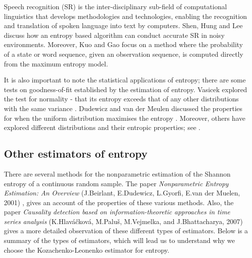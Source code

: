 \documentclass[12pt]{report}
\begin{document}
Speech recognition (SR) is the inter-disciplinary sub-field of computational linguistics that develops methodologies and technologies, enabling the recognition and translation of spoken language into text by computers. Shen, Hung and Lee \cite{speech1} discuss how an entropy based algorithm can conduct accurate SR in noisy environments. Moreover, Kuo and Gao \cite{speech2} focus on a method where the probability of a state or word sequence, given an observation sequence, is computed directly from the maximum entropy model.

It is also important to note the statistical applications of entropy; there are some tests on goodness-of-fit established by the estimation of entropy. Vasicek explored the test for normality - that its entropy exceeds that of any other distributions with the same variance \cite{stat1}. Dudewicz and van der Meulen discussed the properties for when the uniform distribution maximises the entropy \cite{stat2}. Moreover, others have explored different distributions and their entropic properties; see \cite{stat3, stat4}.
 



\subsection{Other estimators of entropy} \label{otherestimators}

There are several methods for the nonparametric estimation of the Shannon entropy of a continuous random sample. The paper \textit{Nonparametric Entropy Estimation: An Overview} (J.Beirlant, E.Dudewicz, L.Gyorfi, E.van der Muelen, 2001) \cite{paper10}, gives an account of the properties of these various methods. Also, the paper \textit{Causality detection based on information-theoretic approaches in time series analysis} (K.Hlav\'{a}\v{c}kov\'{a}, M.Palu\v{s}, M.Vejmelka, and J.Bhattacharya, 2007) \cite{paper7} gives a more detailed observation of these different types of estimators. Below is a summary of the types of estimators, which will lead us to understand why we choose the Kozachenko-Leonenko estimator for entropy. 
\end{document}
